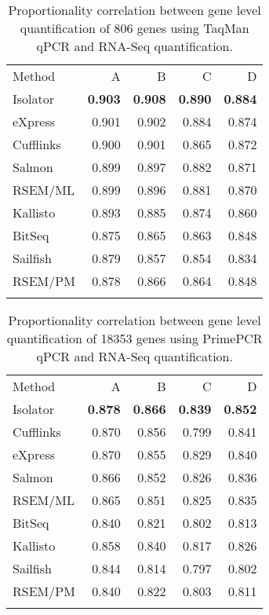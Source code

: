 \documentclass[twocolumn]{article}
\begin{document}
\begin{table}
\begin{tabular}[c]{@{}lrrrr@{}}
\toprule\addlinespace
Method & A & B & C & D
\\\addlinespace
\midrule
Isolator & \textbf{0.903} & \textbf{0.908} & \textbf{0.890} &
\textbf{0.884}
\\\addlinespace
eXpress & 0.901 & 0.902 & 0.884 & 0.874
\\\addlinespace
Cufflinks & 0.900 & 0.901 & 0.865 & 0.872
\\\addlinespace
Salmon & 0.899 & 0.897 & 0.882 & 0.871
\\\addlinespace
RSEM/ML & 0.899 & 0.896 & 0.881 & 0.870
\\\addlinespace
Kallisto & 0.893 & 0.885 & 0.874 & 0.860
\\\addlinespace
BitSeq & 0.875 & 0.865 & 0.863 & 0.848
\\\addlinespace
Sailfish & 0.879 & 0.857 & 0.854 & 0.834
\\\addlinespace
RSEM/PM & 0.878 & 0.866 & 0.864 & 0.848
\\\addlinespace
\bottomrule
\addlinespace
\end{tabular}
\caption{Proportionality correlation between gene level quantification
of 806 genes using TaqMan qPCR and RNA-Seq quantification.}
\label{table:taqman}
\end{table}

\begin{table}\begin{tabular}[c]{@{}lrrrr@{}}
\toprule\addlinespace
Method & A & B & C & D
\\\addlinespace
\midrule
Isolator & \textbf{0.878} & \textbf{0.866} & \textbf{0.839} &
\textbf{0.852}
\\\addlinespace
Cufflinks & 0.870 & 0.856 & 0.799 & 0.841
\\\addlinespace
eXpress & 0.870 & 0.855 & 0.829 & 0.840
\\\addlinespace
Salmon & 0.866 & 0.852 & 0.826 & 0.836
\\\addlinespace
RSEM/ML & 0.865 & 0.851 & 0.825 & 0.835
\\\addlinespace
BitSeq & 0.840 & 0.821 & 0.802 & 0.813
\\\addlinespace
Kallisto & 0.858 & 0.840 & 0.817 & 0.826
\\\addlinespace
Sailfish & 0.844 & 0.814 & 0.797 & 0.802
\\\addlinespace
RSEM/PM & 0.840 & 0.822 & 0.803 & 0.811
\\\addlinespace
\bottomrule
\addlinespace
\end{tabular}
\caption{Proportionality correlation between gene level quantification
of 18353 genes using PrimePCR qPCR and RNA-Seq quantification.}
\label{table:primepcr}
\end{table}
\end{document}
